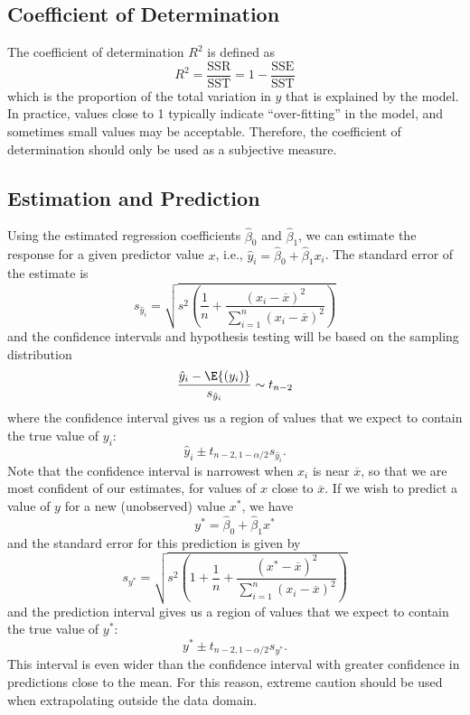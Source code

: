 \documentclass{article}
\begin{document}
\subsection{Coefficient of Determination}
The coefficient of determination \(R^2\) is defined as
\begin{equation*}
    R^2 = \frac{\mathrm{SSR}}{\mathrm{SST}} = 1 - \frac{\mathrm{SSE}}{\mathrm{SST}}
\end{equation*}
which is the proportion of the total variation in \(y\) that is explained by the model.
In practice, values close to 1 typically indicate ``over-fitting'' in the model, and sometimes small values
may be acceptable. Therefore, the coefficient of determination should only be used as a subjective measure.
\subsection{Estimation and Prediction}
Using the estimated regression coefficients \(\hat{\beta}_0\) and
\(\hat{\beta}_1\), we can estimate the response for a given predictor
value \(x\), i.e., \(\hat{y}_i = \hat{\beta}_0 + \hat{\beta}_1 x_i\).
The standard error of the estimate is
\begin{equation*}
    s_{\hat{y}_i} = \sqrt{s^2 \left( \frac{1}{n} + \frac{\left( x_i - \overline{x} \right)^2}{\sum_{i = 1}^n \left( x_i - \overline{x} \right)^2} \right)}
\end{equation*}
and the confidence intervals and hypothesis testing will be based on the sampling distribution
\begin{equation*}
    \frac{\hat{y}_i - \E{\left( y_i \right)}}{s_{\hat{y}_i}} \sim t_{n - 2}
\end{equation*}
where the confidence interval gives us a region of values that we expect to contain the true value of \(y_i\):
\begin{equation*}
    \hat{y}_i \pm t_{n - 2, 1 - \alpha / 2} s_{\hat{y}_i}.
\end{equation*}
Note that the confidence interval is narrowest when \(x_i\) is near \(\overline{x}\), so that we are most confident
of our estimates, for values of \(x\) close to \(\overline{x}\). If we wish to predict a value of \(y\) for a new (unobserved) value
\(x^\ast\), we have
\begin{equation*}
    y^\ast = \hat{\beta}_0 + \hat{\beta}_1 x^\ast
\end{equation*}
and the standard error for this prediction is given by
\begin{equation*}
    s_{y^\ast} = \sqrt{s^2 \left( 1 + \frac{1}{n} + \frac{\left( x^\ast - \overline{x} \right)^2}{\sum_{i = 1}^n \left( x_i - \overline{x} \right)^2} \right)}
\end{equation*}
and the prediction interval gives us a region of values that we expect to contain the true value of \(y^\ast\):
\begin{equation*}
    y^\ast \pm t_{n - 2, 1 - \alpha / 2} s_{y^\ast}.
\end{equation*}
This interval is even wider than the confidence interval with greater confidence in predictions close to the mean.
For this reason, extreme caution should be used when extrapolating outside the data domain.
\end{document}
